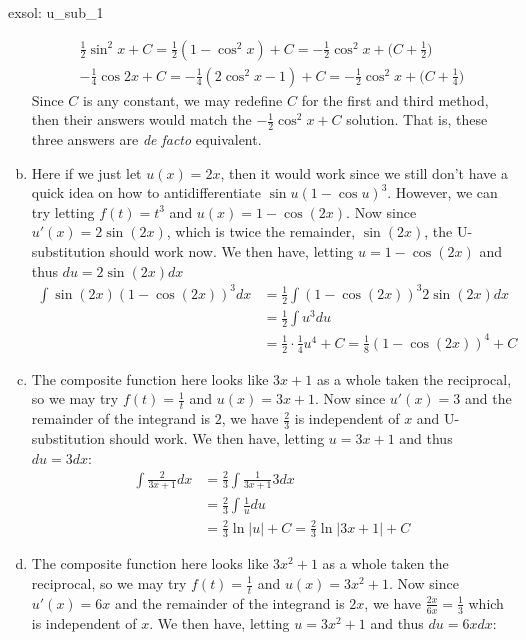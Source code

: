 \begin{exsol}[]{exsol: u_sub_1}
\begin{enumerate}[a)]
\begin{gather*}
            \frac{1}{2}\sin^2x + C = \frac{1}{2}(1-\cos^2x) + C = -\frac{1}{2}\cos^2x + \Big(C+\frac{1}{2}\Big)\\
            -\frac{1}{4}\cos 2x + C  = -\frac{1}{4}(2 \cos^2 x - 1) + C = -\frac{1}{2}\cos^2x + \Big(C+\frac{1}{4}\Big)
        \end{gather*}
        Since $C$ is any constant, we may redefine $C$ for the first and third method, then their answers would match the $-\frac{1}{2}\cos^2x + C$ solution.  That is, these three answers are \textit{de facto} equivalent.
        \item Here if we just let $u(x) = 2x$, then it would work since we still don't have a quick idea on how to antidifferentiate $\sin u (1- \cos u)^3$.  However, we can try letting $f(t) = t^3$ and $u(x) = 1-\cos (2x)$.  Now since $u'(x) = 2\sin(2x)$, which is twice the remainder, $\sin (2x)$, the U-substitution should work now.  We then have, letting $u = 1-\cos (2x)$ and thus $du = 2\sin (2x)dx$
        \begin{align*}
            \int \sin(2x)(1-\cos(2x))^3 dx &= \frac{1}{2}\int (1-\cos(2x))^3 2\sin(2x) dx\\
            &= \frac{1}{2}\int u^3 du\\
            &= \frac{1}{2}\cdot\frac{1}{4}u^{4} + C = \frac{1}{8}(1-\cos (2x))^4 + C
        \end{align*}
        \item The composite function here looks like $3x+1$ as a whole taken the reciprocal, so we may try $f(t) = \frac{1}{t}$ and $u(x) = 3x+1$.  Now since $u'(x) = 3$ and the remainder of the integrand is $2$, we have $\frac{2}{3}$ is independent of $x$ and U-substitution should work.  We then have, letting $u = 3x+1$ and thus $du = 3dx$:
        \begin{align*}
            \int \frac{2}{3x+1} dx &= \frac{2}{3}\int \frac{1}{3x+1} 3dx\\
            &= \frac{2}{3}\int \frac{1}{u} du\\
            &= \frac{2}{3}\ln |u| + C = \frac{2}{3} \ln |3x+1| + C
        \end{align*}
        \item The composite function here looks like $3x^2 +1$ as a whole taken the reciprocal, so we may try $f(t) = \frac{1}{t}$ and $u(x) = 3x^2 + 1$.  Now since $u'(x) = 6x$ and the remainder of the integrand is $2x$, we have $\frac{2x}{6x} = \frac{1}{3}$ which is independent of $x$.  We then have, letting $u = 3x^2 + 1$ and thus $du = 6xdx$:
        \begin{align*}

\end{align*}
\end{enumerate}
\end{exsol}
